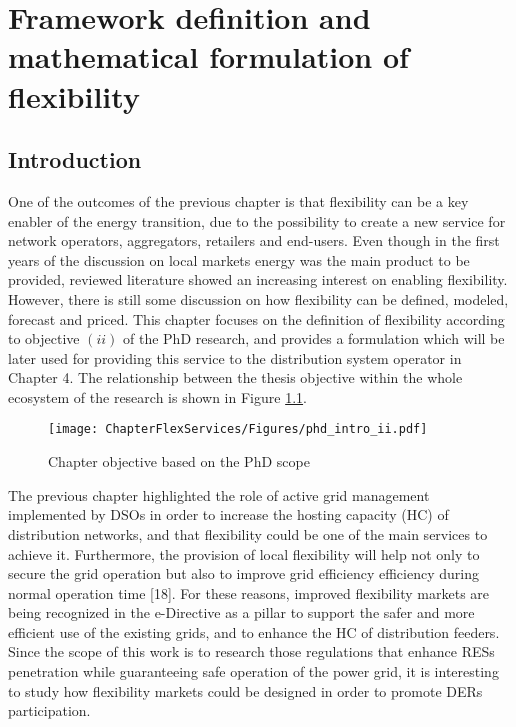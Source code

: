 \chapter{Framework definition and mathematical formulation of flexibility}
\label{chapterFlexibility}

\section{Introduction}
One of the outcomes of the previous chapter is that flexibility can be a key enabler of the energy transition, due to the possibility to create a new service for network operators, aggregators, retailers and end-users. Even though in the first years of the discussion on local markets energy was the main product to be provided, reviewed literature showed an increasing interest on enabling flexibility. However, there is still some discussion on how flexibility can be defined, modeled, forecast and priced. This chapter focuses on the definition of flexibility according to objective $(ii)$ of the PhD research, and provides a formulation which will be later used for providing this service to the distribution system operator in Chapter 4. The relationship between the thesis objective within the whole ecosystem of the research is shown in Figure \ref{fig:chapter_obj_ii}.


\begin{figure}[htbp]
	\centering
	\texttt{[image: ChapterFlexServices/Figures/phd\_intro\_ii.pdf]}
		\caption{Chapter objective based on the PhD scope}
	\label{fig:chapter_obj_ii}  
\end{figure}

The previous chapter highlighted the role of active grid management implemented by DSOs in order to increase the hosting capacity (HC) of distribution networks, and that flexibility could be one of the main services to achieve it. Furthermore, the provision of local flexibility will help not only to secure the grid operation but also to improve grid efficiency efficiency during normal operation time [18]. For these reasons, improved flexibility markets are being recognized in the e-Directive as a pillar to support the safer and more efficient use of the existing grids, and to enhance the HC of distribution feeders. Since the scope of this work is to research those regulations that enhance RESs penetration while guaranteeing safe operation of the power grid, it is interesting to study how flexibility markets could be designed in order to promote DERs participation.



